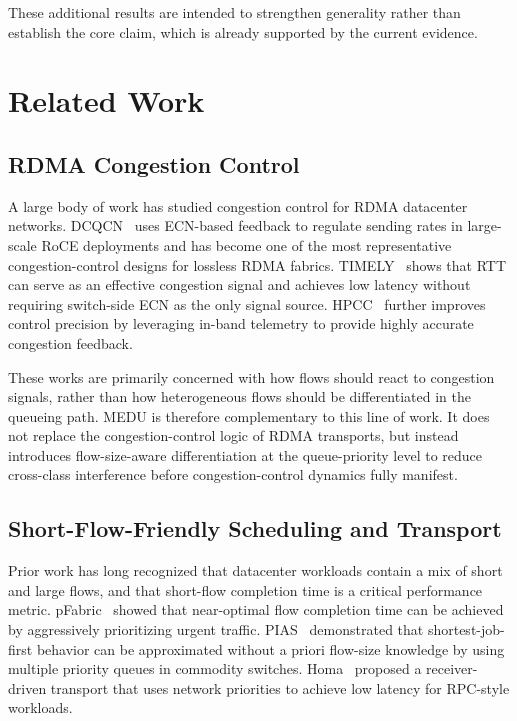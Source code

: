 \documentclass[conference]{IEEEtran}
\begin{document}
These additional results are intended to strengthen generality rather than establish the core claim, which is already supported by the current evidence.

\section{Related Work}

\subsection{RDMA Congestion Control}

A large body of work has studied congestion control for RDMA datacenter networks. DCQCN~\cite{dcqcn} uses ECN-based feedback to regulate sending rates in large-scale RoCE deployments and has become one of the most representative congestion-control designs for lossless RDMA fabrics. TIMELY~\cite{timely} shows that RTT can serve as an effective congestion signal and achieves low latency without requiring switch-side ECN as the only signal source. HPCC~\cite{hpcc} further improves control precision by leveraging in-band telemetry to provide highly accurate congestion feedback.

These works are primarily concerned with how flows should react to congestion signals, rather than how heterogeneous flows should be differentiated in the queueing path. MEDU is therefore complementary to this line of work. It does not replace the congestion-control logic of RDMA transports, but instead introduces flow-size-aware differentiation at the queue-priority level to reduce cross-class interference before congestion-control dynamics fully manifest.

\subsection{Short-Flow-Friendly Scheduling and Transport}

Prior work has long recognized that datacenter workloads contain a mix of short and large flows, and that short-flow completion time is a critical performance metric. pFabric~\cite{pfabric} showed that near-optimal flow completion time can be achieved by aggressively prioritizing urgent traffic. PIAS~\cite{pias} demonstrated that shortest-job-first behavior can be approximated without a priori flow-size knowledge by using multiple priority queues in commodity switches. Homa~\cite{homa} proposed a receiver-driven transport that uses network priorities to achieve low latency for RPC-style workloads.
\end{document}
